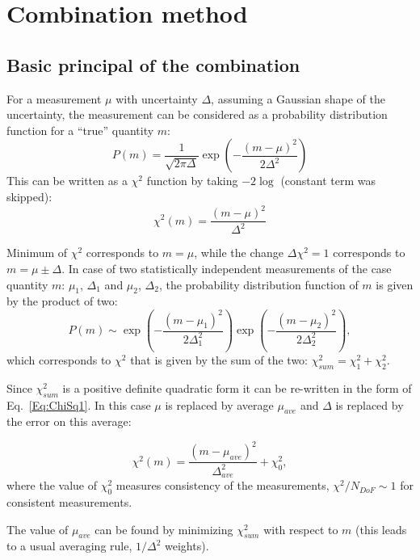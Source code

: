 \section{Combination method}
\label{sec:combDetails}

\subsection{Basic principal of the combination}
\label{Sec:Basic}
For a measurement $\mu$ with uncertainty $\Delta$, assuming a Gaussian shape of the uncertainty, the measurement can be considered as a probability distribution function for a ``true'' quantity $m$:
\begin{equation}
  P(m)=\frac{1}{\sqrt{2\pi \Delta}}\exp\left(-\frac{(m-\mu)^{2}}{2\Delta^{2}}\right)
  \label{Eq:PDFMeas}
\end{equation}
This can be written as a $\chi^2$ function by taking $-2\log$ (constant term was skipped):
\begin{equation}
  \chi^{2}(m)=\frac{\left( m-\mu  \right)^{2}}{\Delta ^{2}}
  \label{Eq:ChiSq1}
\end{equation}

Minimum of $\chi^2$ corresponds to $m=\mu$, while the change $\Delta \chi^2=1$ corresponds to $m=\mu \pm \Delta$. In case of two statistically independent measurements of the case quantity $m$: $\mu_1$, $\Delta_1$ and $\mu_2$, $\Delta_2$, the probability distribution function of $m$ is given by the  product of two:
\begin{equation}
P(m) \sim \exp \left( -\frac{(m-\mu_1)^2}{2\Delta_1^2} \right) 
\exp\left( -\frac{(m-\mu_2)^2}{2\Delta_2^2} \right),
\end{equation}
which corresponds to $\chi^2$ that is given by the sum of the two: $\chi^2_{sum} = \chi^2_1 + \chi^2_2$.

Since $\chi^2_{sum}$ is a positive definite quadratic form it can be re-written in the form of Eq.~\ref{Eq:ChiSq1}. In this case $\mu$ is replaced by average $\mu_{ave}$ and $\Delta$ is replaced by the error on this average:

\begin{equation}
  \chi^{2}(m)=\frac{ ( m-\mu_{ave} )^{2}}{\Delta^{2}_{ave}} + \chi^2_0,
  \label{Eq:ChiSum}
\end{equation}
where the value of $\chi^2_0$ measures consistency of the measurements, $\chi^2/N_{DoF}\sim 1$ for consistent measurements.

The value of $\mu_{ave}$ can be found by minimizing $\chi^2_{sum}$ with respect to $m$ (this leads to a usual averaging rule, $1/\Delta^2$ weights).


